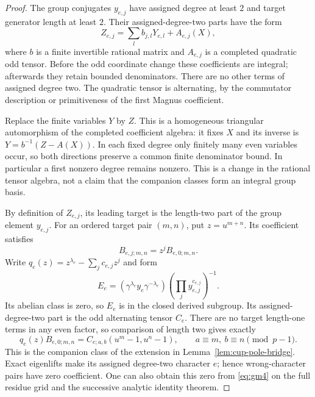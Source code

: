 \documentclass[11pt]{article}
\theoremstyle{definition}
\numberwithin{equation}{section}
\begin{document}
\begin{proof}
The group conjugates $y_{e,j}$ have assigned degree at least $2$
and target generator length at least $2$. Their assigned-degree-two
parts have the form
\begin{equation}
 Z_{e,j}=\sum_l b_{j,l}Y_{e,l}+A_{e,j}(X),                    \label{eq:gm3}
\end{equation}
where $b$ is a finite invertible rational matrix and $A_{e,j}$ is
a completed quadratic odd tensor. Before the odd coordinate change
these coefficients are integral; afterwards they retain bounded
denominators. There are no other terms of assigned degree two.
The quadratic tensor is alternating, by the commutator description
or primitiveness of the first Magnus coefficient.

Replace the finite variables $Y$ by $Z$. This is a homogeneous
triangular automorphism of the completed coefficient algebra:
it fixes $X$ and its inverse is $Y=b^{-1}(Z-A(X))$.
In each fixed degree only finitely many even variables occur,
so both directions preserve a common finite denominator bound.
In particular a first nonzero degree remains nonzero.
This is a change in the rational tensor algebra, not a claim that
the companion classes form an integral group basis.

By definition of $Z_{e,j}$, its leading target is the length-two
part of the group element $y_{e,j}$. For an ordered target pair
$(m,n)$, put $z=u^{m+n}$. Its coefficient satisfies
\begin{equation}
 B_{e,j;m,n}=z^jB_{e,0;m,n}.
\end{equation}
Write $q_e(z)=z^{\lambda_e}-\sum_jc_{e,j}z^j$ and form
\begin{equation}
 E_e=(\gamma^{\lambda_e}y_e\gamma^{-\lambda_e})
       \left(\prod_jy_{e,j}^{c_{e,j}}\right)^{-1}.
\end{equation}
Its abelian class is zero, so $E_e$ is in the closed derived
subgroup. Its assigned-degree-two part is the odd alternating
tensor $C_e$. There are no target length-one terms in any even
factor, so comparison of length two gives exactly
\begin{equation}
 q_e(z)B_{e,0;m,n}
   =C_{e;a,b}(u^m-1,u^n-1),\qquad
 a\equiv m,\ b\equiv n\pmod{p-1}.                           \label{eq:gm4}
\end{equation}
This is the companion class of the extension in
Lemma~\ref{lem:cup-pole-bridge}. Exact eigenlifts make its assigned
degree-two character $e$; hence wrong-character pairs have zero
coefficient. One can also obtain this zero from \eqref{eq:gm4} on the full
residue grid and the successive analytic identity theorem.


\end{proof}
\end{document}

